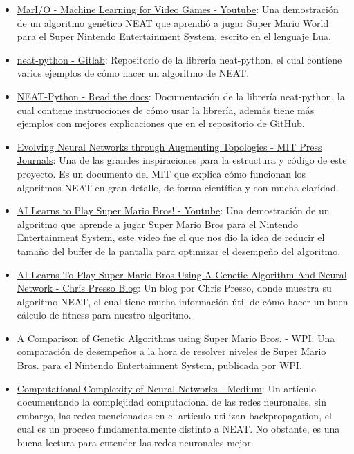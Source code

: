 \documentclass{article}
\begin{document}
\begin{itemize}
  \item \href{https://www.youtube.com/watch?v=qv6UVOQ0F44}{MarI/O - Machine Learning for Video Games - Youtube}: Una demostración de un algoritmo genético NEAT que aprendió a jugar Super Mario World para el Super Nintendo Entertainment System, escrito en el lenguaje Lua.
  \item \href{https://github.com/CodeReclaimers/neat-python}{neat-python - Gitlab}: Repositorio de la librería neat-python, el cual contiene varios ejemplos de cómo hacer un algoritmo de NEAT\@.
  \item \href{https://neat-python.readthedocs.io/en/latest/neat_overview.html}{NEAT-Python - Read the docs}: Documentación de la librería neat-python, la cual contiene instrucciones de cómo usar la librería, además tiene más ejemplos con mejores explicaciones que en el repositorio de GitHub.
  \item \href{http://nn.cs.utexas.edu/downloads/papers/stanley.ec02.pdf}{Evolving Neural Networks through Augmenting Topologies - MIT Press Journals}: Una de las grandes inspiraciones para la estructura y código de este proyecto. Es un documento del MIT que explica cómo funcionan los algoritmos NEAT en gran detalle, de forma científica y con mucha claridad.
  \item \href{https://www.youtube.com/watch?reload=9&v=CI3FRsSAa_U}{AI Learns to Play Super Mario Bros! - Youtube}: Una demostración de un algoritmo que aprende a jugar Super Mario Bros para el Nintendo Entertainment System, este vídeo fue el que nos dio la idea de reducir el tamaño del buffer de la pantalla para optimizar el desempeño del algoritmo.
  \item \href{https://chrispresso.io/AI_Learns_To_Play_SMB_Using_GA_And_NN}{AI Learns To Play Super Mario Bros Using A Genetic Algorithm And Neural Network - Chris Presso Blog}: Un blog por Chris Presso, donde muestra su algoritmo NEAT, el cual tiene mucha información útil de cómo hacer un buen cálculo de fitness para nuestro algoritmo.
  \item \href{https://web.wpi.edu/Pubs/E-project/Available/E-project-042815-140233/unrestricted/main.pdf}{A Comparison of Genetic Algorithms using Super Mario Bros. - WPI}: Una comparación de desempeños a la hora de resolver niveles de Super Mario Bros\@. para el Nintendo Entertainment System, publicada por WPI\@.
  \item \href{https://medium.com/swlh/computational-complexity-of-neural-networks-38c01e7e566a}{Computational Complexity of Neural Networks - Medium}: Un artículo documentando la complejidad computacional de las redes neuronales, sin embargo, las redes mencionadas en el artículo utilizan backpropagation, el cual es un proceso fundamentalmente distinto a NEAT\@. No obstante, es una buena lectura para entender las redes neuronales mejor.

\end{itemize}
\end{document}
